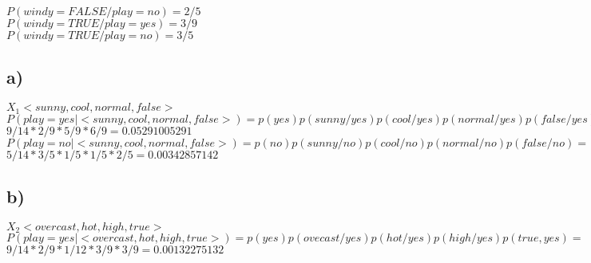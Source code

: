 \documentclass{article}
\begin{document}
\hspace{1cm} $P(windy = FALSE / play = no) = 2/5 $ \\

\hspace{1cm} $P(windy = TRUE / play = yes) = 3/9 $ \\

\hspace{1cm} $P(windy = TRUE / play = no) = 3/5$ \\



\newpage

\hspace{0.5cm} \subsection{a)} \hspace{0.5cm} $X_1 <sunny, cool, normal, false>$ \\

$P(play = yes | <sunny, cool, normal, false>) = p(yes) p(sunny/yes) p(cool/yes) p(normal/yes) p(false/yes) = $ \\

\hspace{1.5cm}$ 9/14 * 2/9 * 5/9 * 6/9 = 0.05291005291 $ \\

$P(play = no | <sunny, cool, normal, false>) = p(no) p(sunny/no) p(cool/no) p(normal/no) p(false/no) = $ \\

\hspace{1.5cm}$5/14 * 3/5 * 1/5 * 1/5 * 2/5 = 0.00342857142 $ \\



\vspace{0.5cm}

\hspace{0.5cm} \subsection{b)} \hspace{0.5cm} $X_2 <	overcast, hot, high, true>$ \\

$P(play = yes | <overcast,hot,high,true>) = p(yes) p(ovecast/yes) p(hot/yes) p(high/yes) p(true,yes) = $ \\

\hspace{1.5cm}$9/14 * 2/9 * 1/12 * 3/9 * 3/9 = 0.00132275132$ \\ 
\end{document}
